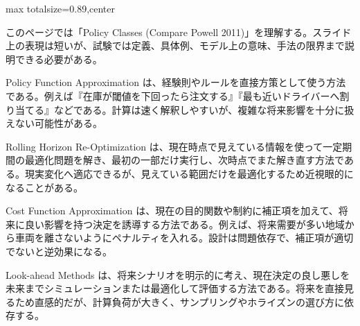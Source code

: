 \begin{minipage}[t]{0.58\textwidth}
\begin{adjustbox}{max totalsize={\textwidth}{0.89\textheight},center}
\begin{minipage}{\textwidth}\scriptsize
{}このページでは「Policy Classes (Compare Powell 2011)」を理解する。スライド上の表現は短いが、試験では定義、具体例、モデル上の意味、手法の限界まで説明できる必要がある。\par
Policy Function Approximation は、経験則やルールを直接方策として使う方法である。例えば『在庫が閾値を下回ったら注文する』『最も近いドライバーへ割り当てる』などである。計算は速く解釈しやすいが、複雑な将来影響を十分に扱えない可能性がある。\par
Rolling Horizon Re-Optimization は、現在時点で見えている情報を使って一定期間の最適化問題を解き、最初の一部だけ実行し、次時点でまた解き直す方法である。現実変化へ適応できるが、見えている範囲だけを最適化するため近視眼的になることがある。\par
Cost Function Approximation は、現在の目的関数や制約に補正項を加えて、将来に良い影響を持つ決定を誘導する方法である。例えば、将来需要が多い地域から車両を離さないようにペナルティを入れる。設計は問題依存で、補正項が適切でないと逆効果になる。\par
Look-ahead Methods は、将来シナリオを明示的に考え、現在決定の良し悪しを未来までシミュレーションまたは最適化して評価する方法である。将来を直接見るため直感的だが、計算負荷が大きく、サンプリングやホライズンの選び方に依存する。\par

\end{minipage}
\end{adjustbox}
\end{minipage}
